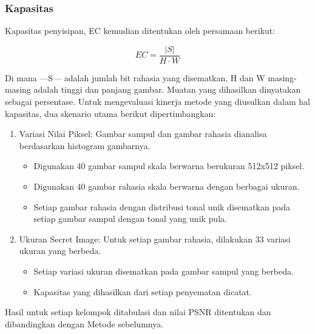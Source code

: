 \documentclass{ittelkom}
\begin{document}
\subsubsection{Kapasitas}

Kapasitas penyisipan, EC kemudian ditentukan oleh persamaan berikut:

\begin{equation}
    EC = \frac{|S|}{H \cdot W}
\end{equation}

Di mana —S— adalah jumlah bit rahasia yang disematkan, H dan W masing-masing
adalah tinggi dan panjang gambar. Muatan yang dihasilkan dinyatakan sebagai
persentase. Untuk mengevaluasi kinerja metode yang diusulkan dalam hal
kapasitas, dua skenario utama berikut dipertimbangkan:

\begin{enumerate}
    \item Variasi Nilai Piksel: Gambar sampul dan gambar rahasia dianalisa berdasarkan
          histogram gambarnya.
          \begin{itemize}
              \item Digunakan 40 gambar sampul skala berwarna berukuran 512x512 piksel.
              \item Digunakan 40 gambar rahasia skala berwarna dengan berbagai ukuran.
              \item Setiap gambar rahasia dengan distribusi tonal unik disematkan pada setiap
                    gambar sampul dengan tonal yang unik pula.
          \end{itemize}
    \item Ukuran Secret Image: Untuk setiap gambar rahasia, dilakukan 33 variasi ukuran
          yang berbeda.
          \begin{itemize}
              \item Setiap variasi ukuran disematkan pada gambar sampul yang berbeda.
              \item Kapasitas yang dihasilkan dari setiap penyematan dicatat.
          \end{itemize}
\end{enumerate}

Hasil untuk setiap kelompok ditabulasi dan nilai PSNR ditentukan dan
dibandingkan dengan Metode sebelumnya.

\end{document}

